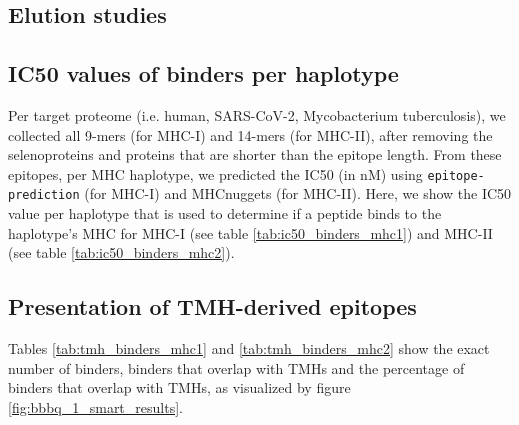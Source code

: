 \subsection{Elution studies}



\subsection{IC50 values of binders per haplotype}
\label{subsec:ic50s_per_haplotype}

Per target proteome (i.e. human, SARS-CoV-2, Mycobacterium tuberculosis),
we collected all 9-mers (for MHC-I) and 14-mers (for MHC-II),
after removing the selenoproteins and proteins that are shorter
than the epitope length.
From these epitopes, per MHC haplotype,
we predicted the IC50 (in nM) using \verb;epitope-prediction; (for MHC-I)
and MHCnuggets (for MHC-II). 
Here, we show the IC50 value per haplotype that
is used to determine if a peptide binds to the haplotype's MHC
for MHC-I (see table \ref{tab:ic50_binders_mhc1}) and 
MHC-II (see table \ref{tab:ic50_binders_mhc2}).





\subsection{Presentation of TMH-derived epitopes}

Tables \ref{tab:tmh_binders_mhc1} and \ref{tab:tmh_binders_mhc2}
show the exact number of binders, binders that overlap with TMHs
and the percentage of binders that overlap with TMHs, as
visualized by figure \ref{fig:bbbq_1_smart_results}.



